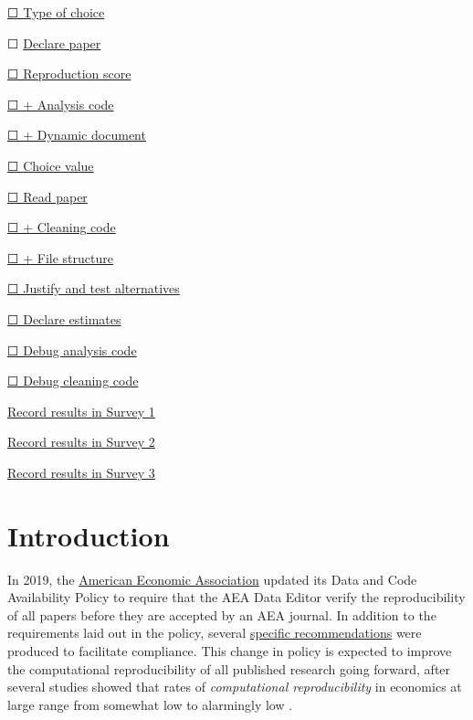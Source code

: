 \documentclass[]{book}
\begin{document}
\protect\hyperlink{id-type}{☐ Type of choice}

☐ \protect\hyperlink{declare}{Declare paper}

\protect\hyperlink{score}{☐ Reproduction score}

\protect\hyperlink{ac}{☐ + Analysis code}

\protect\hyperlink{paper-level}{☐ + Dynamic document}

\protect\hyperlink{id-val}{☐ Choice value}

\protect\hyperlink{read-summ}{☐ Read paper}

\protect\hyperlink{cc}{☐ + Cleaning code}

\protect\hyperlink{paper-level}{☐ + File structure}

\protect\hyperlink{test-rob}{☐ Justify and test alternatives}

\protect\hyperlink{declare-estimates}{☐ Declare estimates}

\protect\hyperlink{dac}{☐ Debug analysis code}

\protect\hyperlink{dcc}{☐ Debug cleaning code}

\href{https://berkeley.qualtrics.com/jfe/form/SV_2bO83uJvU9ZiTXv}{Record results in Survey 1}

\href{https://berkeley.qualtrics.com/jfe/form/SV_2gd9Y3XVtjLpZL7}{Record results in Survey 2}

\href{ADD\%20LINK}{Record results in Survey 3}

\hypertarget{intro}{%
\chapter*{Introduction}\label{intro}}

In 2019, the \href{https://www.aeaweb.org/journals/policies/data-code/}{American Economic Association} updated its Data and Code Availability Policy to require that the AEA Data Editor verify the reproducibility of all papers before they are accepted by an AEA journal. In addition to the requirements laid out in the policy, several \href{https://aeadataeditor.github.io/aea-de-guidance/}{specific recommendations} were produced to facilitate compliance. This change in policy is expected to improve the computational reproducibility of all published research going forward, after several studies showed that rates of \emph{computational reproducibility} in economics at large range from somewhat low to alarmingly low \citep{galiani2018make, chang2015economics, kingi2018reproducibility}.
\end{document}
